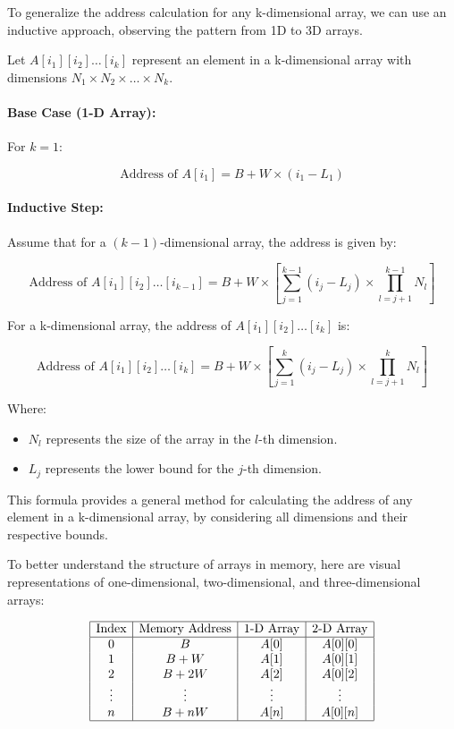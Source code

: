 \documentclass{book}
\begin{document}
To generalize the address calculation for any k-dimensional array, we can use an inductive approach, observing the pattern from 1D to 3D arrays.

Let \( A[i_1][i_2] \dots [i_k] \) represent an element in a k-dimensional array with dimensions \( N_1 \times N_2 \times \dots \times N_k \).

\paragraph{Base Case (1-D Array):}
For \( k = 1 \):

\[
\text{Address of } A[i_1] = B + W \times (i_1 - L_1)
\]

\paragraph{Inductive Step:}
Assume that for a \( (k-1) \)-dimensional array, the address is given by:

\[
\text{Address of } A[i_1][i_2] \dots [i_{k-1}] = B + W \times \left[ \sum_{j=1}^{k-1} (i_j - L_j) \times \prod_{l=j+1}^{k-1} N_l \right]
\]

For a k-dimensional array, the address of \( A[i_1][i_2] \dots [i_k] \) is:

\[
\text{Address of } A[i_1][i_2] \dots [i_k] = B + W \times \left[ \sum_{j=1}^{k} (i_j - L_j) \times \prod_{l=j+1}^{k} N_l \right]
\]

Where:
\begin{itemize}
	\item \( N_l \) represents the size of the array in the \( l \)-th dimension.
	\item \( L_j \) represents the lower bound for the \( j \)-th dimension.
\end{itemize}

This formula provides a general method for calculating the address of any element in a k-dimensional array, by considering all dimensions and their respective bounds.

To better understand the structure of arrays in memory, here are visual representations of one-dimensional, two-dimensional, and three-dimensional arrays:

\[
\begin{array}{|c|c|c|c|}
	\hline
	\text{Index} & \text{Memory Address} & \text{1-D Array} & \text{2-D Array} \\
	\hline
	0 & B & A[0] & A[0][0] \\
	1 & B + W & A[1] & A[0][1] \\
	2 & B + 2W & A[2] & A[0][2] \\
	\vdots & \vdots & \vdots & \vdots \\
	n & B + nW & A[n] & A[0][n] \\
	\hline
\end{array}
\]
\end{document}
